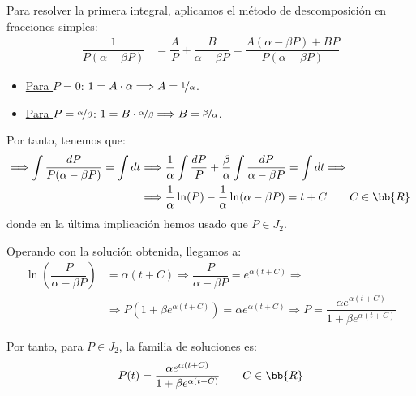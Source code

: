 \begin{ejercicio}
\begin{itemize}
        Para resolver la primera integral, aplicamos el método de descomposición en fracciones simples:
        \begin{align*}
            \dfrac{1}{P(\alpha - \beta P)} &= \dfrac{A}{P} + \dfrac{B}{\alpha - \beta P} = \dfrac{A(\alpha - \beta P) + BP}{P(\alpha - \beta P)}
        \end{align*}
        \begin{itemize}
            \item \ul{Para $P=0$}: $1=A \cdot \alpha \Longrightarrow A=\nicefrac{1}{\alpha}$.
            \item \ul{Para $P=\nicefrac{\alpha}{\beta}$}: $1=B \cdot \nicefrac{\alpha}{\beta} \Longrightarrow B=\nicefrac{\beta}{\alpha}$.
        \end{itemize}

        Por tanto, tenemos que:
        \begin{align*}
            \Longrightarrow \int \dfrac{dP}{P(\alpha - \beta P)} = \int dt
            &\Longrightarrow \frac{1}{\alpha}\int \dfrac{dP}{P} + \frac{\beta}{\alpha}\int \dfrac{dP}{\alpha - \beta P} = \int dt \Longrightarrow \\ &\Longrightarrow \dfrac{1}{\alpha}\ln(P) - \dfrac{1}{\alpha}\ln(\alpha - \beta P) = t + C \qquad C\in \bb{R}
        \end{align*}
        donde en la última implicación hemos usado que $P\in J_2$.

        Operando con la solución obtenida, llegamos a:
        \begin{align*}
            \ln\left(\dfrac{P}{\alpha - \beta P}\right) &= \alpha(t + C) \Longrightarrow \dfrac{P}{\alpha - \beta P} = e^{\alpha (t + C)}
            \Longrightarrow\\ &\Longrightarrow P(1+\beta e^{\alpha (t + C)}) = \alpha e^{\alpha (t + C)} \Longrightarrow P = \dfrac{\alpha e^{\alpha (t + C)}}{1+\beta e^{\alpha (t + C)}}
        \end{align*}

        Por tanto, para $P\in J_2$, la familia de soluciones es:
        \begin{equation*}
            P(t) = \dfrac{\alpha e^{\alpha (t + C)}}{1+\beta e^{\alpha (t + C)}} \qquad C\in \bb{R}
        \end{equation*}


\end{itemize}
\end{ejercicio}
